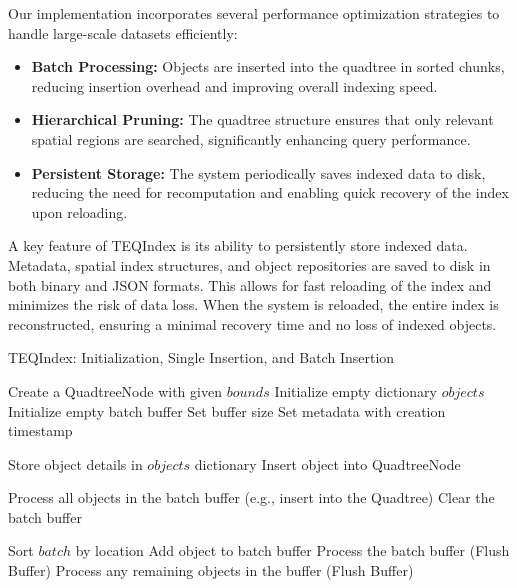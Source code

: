 \documentclass[conference]{IEEEtran}
\begin{document}
Our implementation incorporates several performance optimization strategies to handle large-scale datasets efficiently:

\begin{itemize}
    \item \textbf{Batch Processing:} Objects are inserted into the quadtree in sorted chunks, reducing insertion overhead and improving overall indexing speed.
    \item \textbf{Hierarchical Pruning:} The quadtree structure ensures that only relevant spatial regions are searched, significantly enhancing query performance.
    \item \textbf{Persistent Storage:} The system periodically saves indexed data to disk, reducing the need for recomputation and enabling quick recovery of the index upon reloading.
\end{itemize}

A key feature of TEQIndex is its ability to persistently store indexed data. Metadata, spatial index structures, and object repositories are saved to disk in both binary and JSON formats. This allows for fast reloading of the index and minimizes the risk of data loss. When the system is reloaded, the entire index is reconstructed, ensuring a minimal recovery time and no loss of indexed objects.

\begin{algorithm}
    \caption{TEQIndex: Initialization, Single Insertion, and Batch Insertion}
    \begin{algorithmic}[1]
    \State Create a QuadtreeNode with given $bounds$
    \State Initialize empty dictionary $objects$
    \State Initialize empty batch buffer
    \State Set buffer size
    \State Set metadata with creation timestamp
    \EndProcedure
    
    \State Store object details in $objects$ dictionary
    \State Insert object into QuadtreeNode
    \EndProcedure
    
    \State Process all objects in the batch buffer (e.g., insert into the Quadtree)
    \State Clear the batch buffer
    \EndProcedure
    
    \State Sort $batch$ by location
        \State Add object to batch buffer
             \State Process the batch buffer (Flush Buffer)
        \EndIf
    \EndFor
    \State Process any remaining objects in the buffer (Flush Buffer)
    \EndProcedure
    \end{algorithmic}
\end{algorithm}
\end{document}

